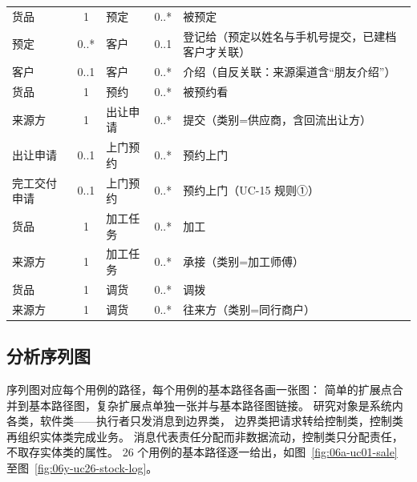 \documentclass[12pt, a4paper]{ctexart}
\begin{document}
\begin{table}[H]
\begin{tabularx}{\textwidth}{@{}l c l c X@{}}
货品 & 1 & 预定 & 0..* & 被预定 \\
预定 & 0..* & 客户 & 0..1 & 登记给（预定以姓名与手机号提交，已建档客户才关联） \\
客户 & 0..1 & 客户 & 0..* & 介绍（自反关联：来源渠道含“朋友介绍”） \\
货品 & 1 & 预约 & 0..* & 被预约看 \\
来源方 & 1 & 出让申请 & 0..* & 提交（类别=供应商，含回流出让方） \\
出让申请 & 0..1 & 上门预约 & 0..* & 预约上门 \\
完工交付申请 & 0..1 & 上门预约 & 0..* & 预约上门（UC-15 规则①） \\
货品 & 1 & 加工任务 & 0..* & 加工 \\
来源方 & 1 & 加工任务 & 0..* & 承接（类别=加工师傅） \\
货品 & 1 & 调货 & 0..* & 调拨 \\
来源方 & 1 & 调货 & 0..* & 往来方（类别=同行商户） \\
\bottomrule
\end{tabularx}
\end{table}

\subsection{分析序列图}

序列图对应每个用例的路径，每个用例的基本路径各画一张图：
简单的扩展点合并到基本路径图，复杂扩展点单独一张并与基本路径图链接。
研究对象是系统内各类，软件类——执行者只发消息到边界类，
边界类把请求转给控制类，控制类再组织实体类完成业务。
消息代表责任分配而非数据流动，控制类只分配责任，不取存实体类的属性。
26 个用例的基本路径逐一给出，如图~\ref{fig:06a-uc01-sale} 至图~\ref{fig:06y-uc26-stock-log}。
\end{document}
